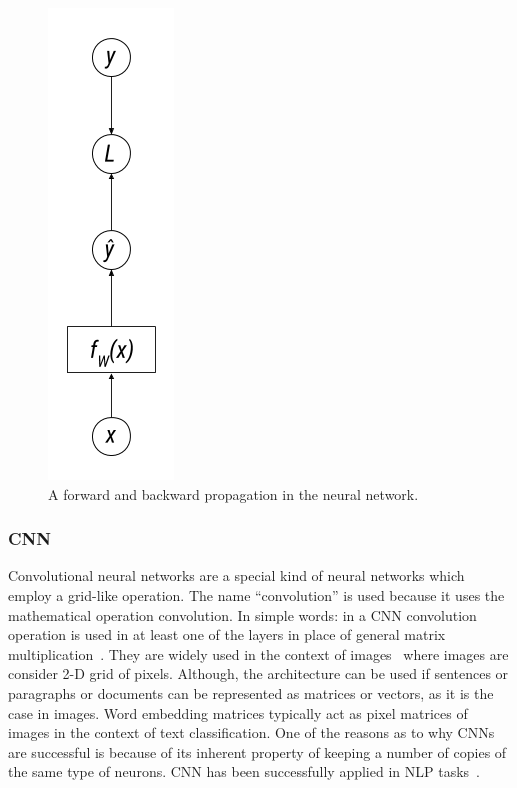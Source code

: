 \begin{figure}
    \centering
    \includegraphics[scale=0.5]{Figures/back-propagation.png}
    \caption{A forward and backward propagation in the neural network.}
    \label{fig:oneepoch}
\end{figure}


\subsubsection{CNN}\label{sec:cnn}
Convolutional neural networks are a special kind of neural networks which employ a grid-like operation. The name ``convolution'' is used because it uses the mathematical operation convolution. In simple words: in a CNN convolution operation is used in at least one of the layers in place of general matrix multiplication~\cite{Goodfellow-et-al-2016}.
They are widely used in the context of images~\cite{krizhevsky2012imagenet} where images are consider 2-D grid of pixels. Although, the architecture can be used if sentences or paragraphs or documents can be represented as matrices or vectors, as it is the case in images. Word embedding matrices typically act as pixel matrices of images in the context of text classification. One of the reasons as to why CNNs are successful is because of its inherent property of keeping a number of copies of the same type of neurons. 
CNN has been successfully applied in NLP tasks~\cite{dos2014deep, zeng2014relation}. 


